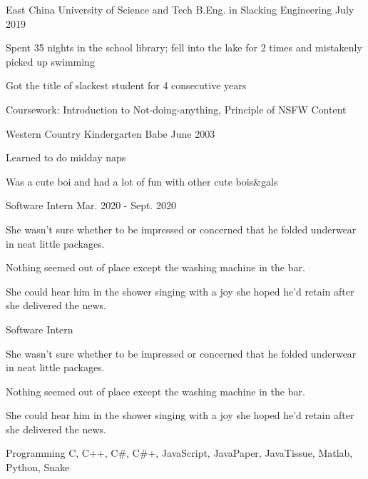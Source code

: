 \documentclass[12pt, a4paper]{yp-vita}
\begin{document}
    \makename
    \makecontact{\myemail}{\mymobile}{\mygithub}{\mylinkedin}
    \smallskip

    \mentry
        {East China University of Science and Tech}
        {B.Eng. in Slacking Engineering}
        {July 2019}
        {
            \begin{cvitems} %
              \item {Spent 35 nights in the school library; fell into the lake for 2 times and mistakenly picked up swimming}
              \item {Got the title of slackest student for 4 consecutive years}
              \item {Coursework: Introduction to Not-doing-anything, Principle of NSFW Content}
            \end{cvitems}
          }
    
    \smallskip

    \mentry
        {Western Country Kindergarten}
        {Babe}
        {June 2003}
        {
            \begin{cvitems} %
                \item {Learned to do midday naps}
                \item {Was a cute boi and had a lot of fun with other cute bois\&gals}
            \end{cvitems}
        }
    
    

    {Software Intern}
    {Mar. 2020 - Sept. 2020}
    {
        \begin{cvitems}
            \item {She wasn't sure whether to be impressed or concerned that he folded underwear in neat little packages.}
            \item {Nothing seemed out of place except the washing machine in the bar.}
            \item {She could hear him in the shower singing with a joy she hoped he'd retain after she delivered the news.}
        \end{cvitems}
    }
    

    {Software Intern}
    {}
    {
        \begin{cvitems}
            \item {She wasn't sure whether to be impressed or concerned that he folded underwear in neat little packages.}
            \item {Nothing seemed out of place except the washing machine in the bar.}
            \item {She could hear him in the shower singing with a joy she hoped he'd retain after she delivered the news.}
        \end{cvitems}
    }


    \skillentry
        {Programming}
        {C, C++, C\#, C\#+, JavaScript, JavaPaper, JavaTissue, Matlab, Python, Snake}

\end{document}
